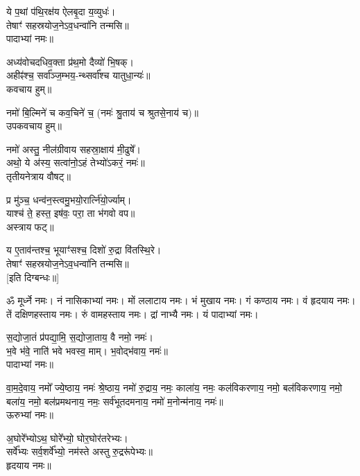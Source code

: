 ये प॒थां प॑थि॒रक्ष॑य ऐलबृ॒दा य॒व्युधः॑।\\
तेषाꣳ॑ सहस्रयोज॒नेऽव॒धन्वा॑नि तन्मसि॥\\
पादाभ्यां नमः॥

अध्य॑वोचदधिव॒क्ता प्र॑थ॒मो दैव्यो॑ भि॒षक्।\\
अहीꣴ॑श्च॒ सर्वा᳚ञ्ज॒म्भय॒-न्थ्सर्वा᳚श्च यातुधा॒न्यः॑॥\\
कवचाय हुम्॥

नमो॑ बि॒ल्मिने॑ च कव॒चिने॑ च॒ (नमः॑ श्रु॒ताय॑ च श्रुतसे॒नाय॑ च)॥\\
उपकवचाय हुम्॥

नमो॑ अस्तु॒ नील॑ग्रीवाय सहस्रा॒क्षाय॑ मी॒ढुषे᳚। \\
अथो॒ ये अ॑स्य॒ सत्वा॑नो॒ऽहं तेभ्यो॑ऽकरं॒ नमः॑॥\\
तृतीयनेत्राय वौषट्॥

प्र मु॑ञ्च॒ धन्व॑न॒स्त्वमु॒भयो॒रार्त्नि॑यो॒र्ज्याम्।\\
याश्च॑ ते॒ हस्त॒ इष॑वः॒ परा॒ ता भ॑गवो वप॥\\
अस्त्राय फट्॥

य ए॒ताव॑न्तश्च॒ भूयाꣳ॑सश्च॒ दिशो॑ रु॒द्रा वि॑तस्थि॒रे।\\
तेषाꣳ॑ सहस्रयोज॒नेऽव॒धन्वा॑नि तन्मसि॥\\

{[इति दिग्बन्धः॥]}

{\small \closesection}

ॐ मूर्ध्ने नमः। नं नासिकाभ्यां नमः। मों ललाटाय नमः। भं मुखाय नमः। गं कण्ठाय नमः। वं हृदयाय नमः। तें दक्षिणहस्ताय नमः। रुं वामहस्ताय नमः। द्रां नाभ्यै नमः। यं पादाभ्यां नमः।

स॒द्योजा॒तं प्र॑पद्या॒मि॒ स॒द्योजा॒ताय॒ वै नमो॒ नमः॑।\\
भ॒वे भ॑वे॒ नाति॑ भवे भवस्व॒ माम्। भ॒वोद्भ॑वाय॒ नमः॑॥\\
पादाभ्यां नमः॥

वा॒म॒दे॒वाय॒ नमो᳚ ज्ये॒ष्ठाय॒ नमः॑ श्रे॒ष्ठाय॒ नमो॑ रु॒द्राय॒ नमः॒ काला॑य॒ नमः॒ कल॑विकरणाय॒ नमो॒ बल॑विकरणाय॒ नमो॒ बला॑य॒ नमो॒ बल॑प्रमथनाय॒ नमः॒ सर्व॑भूतदमनाय॒ नमो॑ म॒नोन्म॑नाय॒ नमः॑॥\\
ऊरुभ्यां नमः॥

अ॒घोरे᳚भ्योऽथ॒ घोरे᳚भ्यो॒ घोर॒घोर॑तरेभ्यः।\\
सर्वे᳚भ्यः सर्व॒शर्वे᳚भ्यो॒ नम॑स्ते अस्तु रु॒द्ररू॑पेभ्यः॥\\
हृदयाय नमः॥

